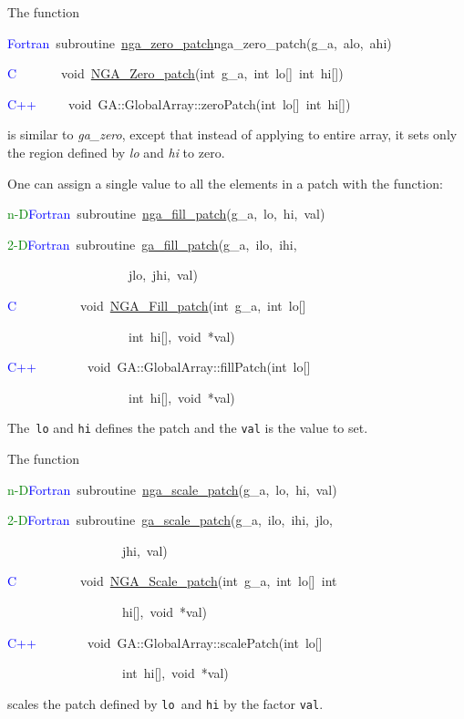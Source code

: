 The function
\begin{lyxcode}
\textcolor{blue}{Fortran}~subroutine~\href{http://www.emsl.pnl.gov/docs/global/ga_ops.html\#ga_zero_patch}{nga\_{}zero\_{}patch}nga\_zero\_patch(g\_a,~alo,~ahi)~

\textcolor{blue}{C}~~~~~~~void~\href{http://www.emsl.pnl.gov/docs/global/c_nga_ops.html\#ga_zero_patch}{NGA\_{}Zero\_{}patch}(int~g\_a,~int~lo{[}{]}~int~hi{[}{]})~

\textcolor{blue}{C++}~~~~~void~GA::GlobalArray::zeroPatch(int~lo{[}{]}~int~hi{[}{]})
\end{lyxcode}
is similar to \emph{ga\_zero}, except that instead of applying to
entire array, it sets only the region defined by \emph{lo} and \emph{hi}
to zero.

One can assign a single value to all the elements in a patch with
the function:
\begin{lyxcode}
\textcolor{green}{n-D}\textcolor{blue}{Fortran}~subroutine~\href{http://www.emsl.pnl.gov/docs/global/ga_ops.html\#ga_fill_patch}{nga\_{}fill\_{}patch}(g\_a,~lo,~hi,~val)~

\textcolor{green}{2-D}\textcolor{blue}{Fortran}~subroutine~\href{http://www.emsl.pnl.gov/docs/global/ga_ops.html\#ga_fill_patch}{ga\_{}fill\_{}patch}(g\_a,~ilo,~ihi,~

~~~~~~~~~~~~~~~~~~~jlo,~jhi,~val)~

\textcolor{blue}{C}~~~~~~~~~~void~\href{http://www.emsl.pnl.gov/docs/global/c_nga_ops.html\#ga_fill_patch}{NGA\_{}Fill\_{}patch}(int~g\_a,~int~lo{[}{]}~

~~~~~~~~~~~~~~~~~~~int~hi{[}{]},~void~{*}val)~

\textcolor{blue}{C++}~~~~~~~~void~GA::GlobalArray::fillPatch(int~lo{[}{]}~

~~~~~~~~~~~~~~~~~~~int~hi{[}{]},~void~{*}val)
\end{lyxcode}
The\texttt{ lo} and \texttt{hi} defines the patch and the \texttt{val}
is the value to set.

The function
\begin{lyxcode}
\textcolor{green}{n-D}\textcolor{blue}{Fortran}~subroutine~\href{http://www.emsl.pnl.gov/docs/global/ga_ops.html\#ga_scale_patch}{nga\_{}scale\_{}patch}(g\_a,~lo,~hi,~val)~

\textcolor{green}{2-D}\textcolor{blue}{Fortran}~subroutine~\href{http://www.emsl.pnl.gov/docs/global/ga_ops.html\#ga_scale_patch}{ga\_{}scale\_{}patch}(g\_a,~ilo,~ihi,~jlo,~

~~~~~~~~~~~~~~~~~~jhi,~val)~

\textcolor{blue}{C}~~~~~~~~~~void~\href{http://www.emsl.pnl.gov/docs/global/c_nga_ops.html\#ga_scale_patch}{NGA\_{}Scale\_{}patch}(int~g\_a,~int~lo{[}{]}~int~

~~~~~~~~~~~~~~~~~~hi{[}{]},~void~{*}val)~

\textcolor{blue}{C++}~~~~~~~~void~GA::GlobalArray::scalePatch(int~lo{[}{]}~

~~~~~~~~~~~~~~~~~~int~hi{[}{]},~void~{*}val)
\end{lyxcode}
scales the patch defined by \texttt{lo }and \texttt{hi} by the factor
\texttt{val}.


